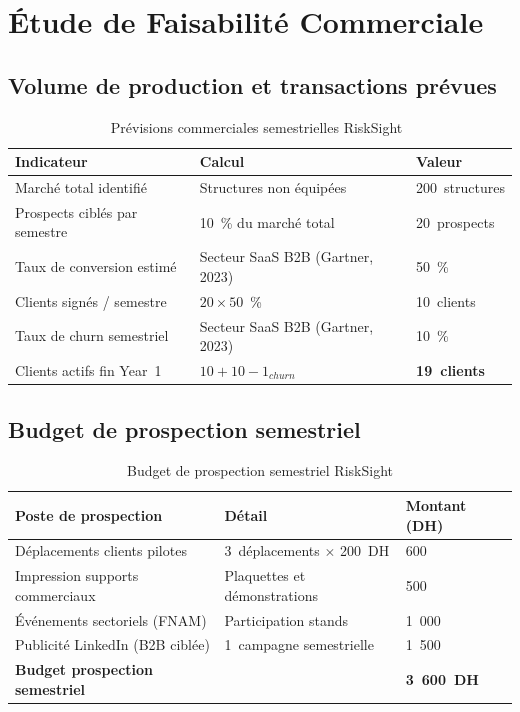\documentclass[12pt, a4paper]{report}
\begin{document}
\section{Étude de Faisabilité Commerciale}

\subsection{Volume de production et transactions prévues}

\begin{table}[H]
\centering
\caption{Prévisions commerciales semestrielles RiskSight~\cite{tp3_faisabilite}}
\label{tab:previsions}
\renewcommand{\arraystretch}{1.3}
\begin{tabularx}{\textwidth}{X p{4cm} p{3cm}}
\toprule
\rowcolor{primary!12}
Indicateur & Calcul & Valeur \\
\midrule
Marché total identifié & Structures non équipées~\cite{fnam} & 200~structures \\
Prospects ciblés par semestre & 10~\% du marché total & 20~prospects \\
Taux de conversion estimé & Secteur SaaS B2B (Gartner, 2023) & 50~\% \\
Clients signés / semestre & $20 \times 50$~\% & 10~clients \\
Taux de churn semestriel & Secteur SaaS B2B (Gartner, 2023) & 10~\% \\
Clients actifs fin Year~1 & $10 + 10 - 1_{churn}$ & \textbf{19~clients} \\
\bottomrule
\end{tabularx}
\end{table}

\subsection{Budget de prospection semestriel}

\begin{table}[H]
\centering
\caption{Budget de prospection semestriel RiskSight}
\label{tab:prospection}
\renewcommand{\arraystretch}{1.3}
\begin{tabularx}{\textwidth}{X p{4cm} p{3cm}}
\toprule
\rowcolor{primary!12}
Poste de prospection & Détail & Montant (DH) \\
\midrule
Déplacements clients pilotes & 3~déplacements $\times$ 200~DH & 600 \\
Impression supports commerciaux & Plaquettes et démonstrations & 500 \\
Événements sectoriels (FNAM) & Participation stands & 1~000 \\
Publicité LinkedIn (B2B ciblée) & 1~campagne semestrielle & 1~500 \\
\midrule
\textbf{Budget prospection semestriel} & & \textbf{3~600~DH} \\
\bottomrule
\end{tabularx}
\end{table}
\end{document}
